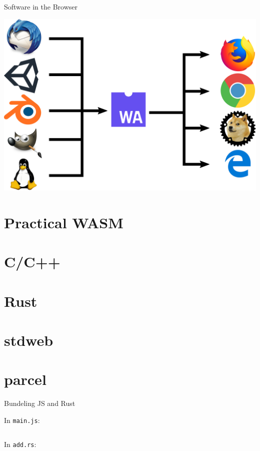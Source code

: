 \documentclass{lug}
\newcommand{\pmidg}[1]{\parbox{\widthof{#1}}{#1}}
\begin{document}
\begin{frame}{Software in the Browser}
    \pmidg{\includegraphics[width=\columnwidth]{graphics/wasm_chain}}
\end{frame}

\renewcommand{\secimage}{graphics/js_disabled}
\section{Practical WASM}

\renewcommand{\secimage}{graphics/c_logo}
\section{C/C++}

\renewcommand{\secimage}{graphics/rust_logo}
\section{Rust}

\renewcommand{\secimage}{graphics/stdweb_logo}
\section{stdweb}

\renewcommand{\secimage}{graphics/parcel_logo}
\section{parcel}

\begin{frame}{Bundeling JS and Rust}

In \texttt{main.js}:

\inputminted{js}{code/add.js}

In \texttt{add.rs}:

\inputminted{rust}{code/add.rs}

\end{frame}
\end{document}
